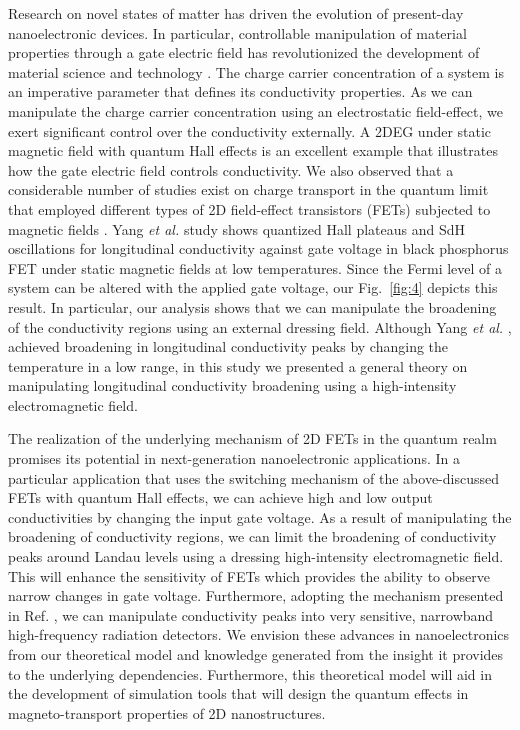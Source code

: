 \documentclass[
 reprint,
 amsmath,amssymb,
 aps,
 prb,
]{revtex4-2}
\begin{document}
{Research on novel states of matter has driven the evolution of present-day nanoelectronic devices. In particular, controllable manipulation of material properties through a gate electric field has revolutionized the development of material science and technology \cite{ahn03,deng18}.
The charge carrier concentration of a system is an imperative parameter that defines its conductivity properties.
As we can manipulate the charge carrier concentration using an electrostatic field-effect, we exert significant control over the conductivity externally.
A 2DEG under static magnetic field with quantum Hall effects is an excellent example that illustrates how the gate electric field controls conductivity.
We also observed that a considerable number of studies exist on charge transport in the quantum limit that employed different types of 2D field-effect transistors (FETs) subjected to magnetic fields \cite{wakabayashi78,yang18,long20,li14}. Yang \textit{et al.} \cite{yang18} study shows quantized Hall plateaus and SdH oscillations for longitudinal conductivity against gate voltage in black phosphorus FET under static magnetic fields at low temperatures. Since the Fermi level of a system can be altered with the applied gate voltage, our Fig.~\ref{fig:4} depicts this result.
In particular, our analysis shows that we can manipulate the broadening of the conductivity regions using an external dressing field. Although Yang \textit{et al.} \cite{yang18}, achieved broadening in longitudinal conductivity peaks by changing the temperature in a low range, in this study we presented a general theory on manipulating longitudinal conductivity broadening using a high-intensity electromagnetic field.

The realization of the underlying mechanism of 2D FETs in the quantum realm promises its potential in next-generation nanoelectronic applications. In a particular application that uses the switching mechanism of the above-discussed FETs with quantum Hall effects, we can achieve high and low output conductivities by changing the input gate voltage. As a result of manipulating the broadening of conductivity regions, we can limit the broadening of conductivity peaks around Landau levels using a dressing high-intensity electromagnetic field. This will enhance the sensitivity of FETs which provides the ability to observe narrow changes in gate voltage.
Furthermore, adopting the mechanism presented in Ref. \cite{hirakawa01}, we can manipulate conductivity peaks into very sensitive, narrowband high-frequency radiation detectors.
We envision these advances in nanoelectronics from our theoretical model and knowledge generated from the insight it provides to the underlying dependencies.
Furthermore, this theoretical model will aid in the development of simulation tools that will design the quantum effects in
magneto-transport properties of 2D nanostructures.
}
\end{document}
